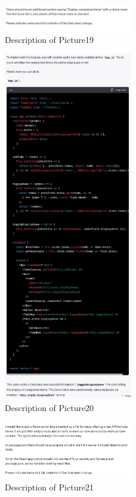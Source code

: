 \documentclass[runningheads]{llncs}
\begin{document}
\begin{figure}[h]
    \centering
    \includegraphics[width=0.5\textwidth]{Pictures/Picture19.jpg}
    \caption{Description of Picture19}
    \label{fig:picture19}
\end{figure}
\begin{figure}[h]
    \centering
    \includegraphics[width=0.5\textwidth]{Pictures/Picture20.jpg}
    \caption{Description of Picture20}
    \label{fig:picture20}
\end{figure}
\begin{figure}[h]
    \centering
    \includegraphics[width=0.5\textwidth]{Pictures/Picture21.jpg}
    \caption{Description of Picture21}
    \label{fig:picture21}
\end{figure}
\end{document}
